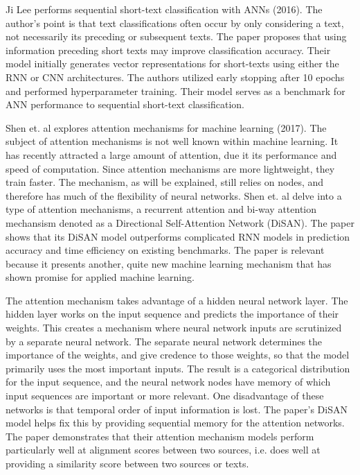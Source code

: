 Ji Lee performs sequential short-text classification with ANNs (2016). The author's point is that text classifications often occur by only considering a text, not necessarily its preceding or subsequent texts.  The paper proposes that using information preceding short texts may improve classification accuracy.  Their model initially generates vector representations for short-texts using either the RNN or CNN architectures.  The authors utilized early stopping after 10 epochs and performed hyperparameter training.  Their model serves as a benchmark for ANN performance to sequential short-text classification.

Shen et. al explores attention mechanisms for machine learning (2017).  The subject of attention mechanisms is not well known within machine learning.  It has recently attracted a large amount of attention, due it its performance and speed of computation.  Since attention mechanisms are more lightweight, they train faster.  The mechanism, as will be explained, still relies on nodes, and therefore has much of the flexibility of neural networks.  Shen et. al delve into a type of attention mechanisms, a recurrent attention and bi-way attention mechansism denoted as a Directional Self-Attention Network (DiSAN).  The paper shows that its DiSAN model outperforms complicated RNN models in prediction accuracy and time efficiency on existing benchmarks.  The paper is relevant because it presents another, quite new machine learning mechanism that has shown promise for applied machine learning.

The attention mechanism takes advantage of a hidden neural network layer.  The hidden layer works on the input sequence and predicts the importance of their weights.  This creates a mechanism where neural network inputs are scrutinized by a separate neural network.  The separate neural network determines the importance of the weights, and give credence to those weights, so that the model primarily uses the most important inputs.  The result is a categorical distribution for the input sequence, and the neural network nodes have memory of which input sequences are important or more relevant.  One disadvantage of these networks is that temporal order of input information is lost.  The paper's DiSAN model helps fix this by providing sequential memory for the attention networks.  The paper demonstrates that their attention mechanism models perform particularly well at alignment scores between two sources, i.e. does well at providing a similarity score between two sources or texts.

